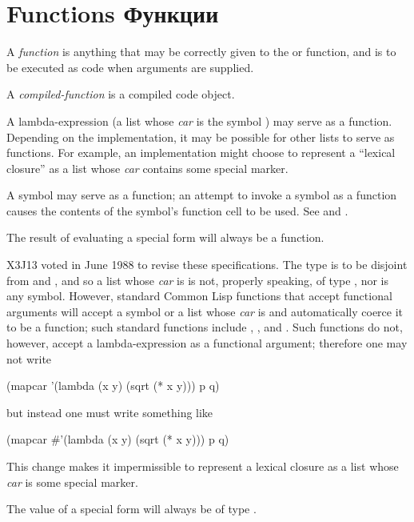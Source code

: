 \section{Functions Функции}
\label{FUNCTION-TYPE-SECTION}

\begin{obsolete}
A {\it function} is anything that may be correctly given to the 
or  function, and is
to be executed as code when arguments are supplied.

A {\it compiled-function} is a compiled code object.

A lambda-expression
(a list whose {\it car} is the symbol ) may serve as a function.
Depending on the implementation, it may be possible for other lists to
serve as functions.  For example, an implementation might choose to
represent a ``lexical closure'' as a list whose {\it car} contains some
special marker.

A symbol may serve as a function; an attempt to invoke a symbol as a function
causes the contents of the symbol's function cell to be used.
See  and .

The result of evaluating a  special form
will always be a function.
\end{obsolete}

\begin{newer}
X3J13 voted in June 1988 
to revise these specifications.  The type  is to be disjoint
from  and , and so a list whose {\it car} is 
is not, properly speaking, of type , nor is any symbol.
However,
standard Common Lisp functions that accept functional arguments
will accept a symbol or a list whose {\it car} is 
and automatically coerce it to be a function; such standard
functions include , , and .
Such functions do not, however, accept a lambda-expression as a functional
argument; therefore one may not write

\vskip 3pt
\begin{lisp}
(mapcar '(lambda (x y) (sqrt (* x y))) p q)
\end{lisp}
but instead one must write something like
\begin{lisp}
(mapcar \#'(lambda (x y) (sqrt (* x y))) p q)
\end{lisp}

This change makes it impermissible to represent a lexical closure
as a list whose {\it car} is some special marker.

The value of a  special form
will always be of type .
\end{newer}

